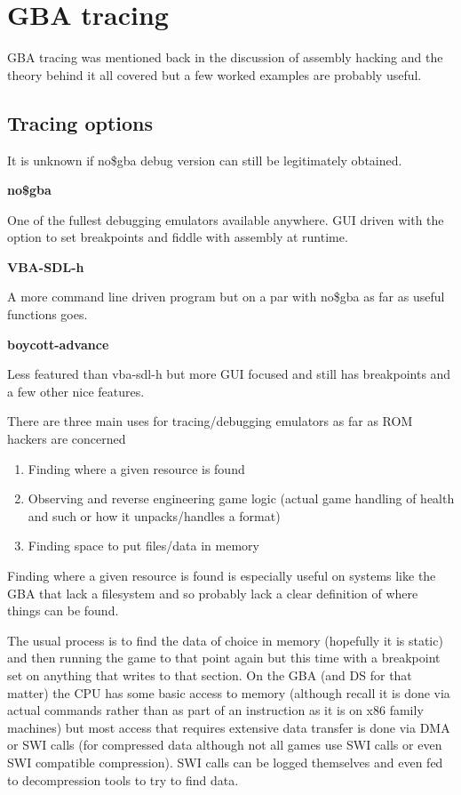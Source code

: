 \documentclass[
]{book}
\providecommand{\tightlist}{%
  \setlength{\itemsep}{0pt}\setlength{\parskip}{0pt}}
\begin{document}
\hypertarget{gba-tracing}{%
\chapter{GBA tracing}\label{gba-tracing}}

GBA tracing was mentioned back in the discussion of assembly hacking and the theory behind it all covered but a few worked examples are probably useful.

\hypertarget{tracing-options}{%
\section{Tracing options}\label{tracing-options}}

It is unknown if no\$gba debug version can still be legitimately obtained.

\textbf{no\$gba}

One of the fullest debugging emulators available anywhere. GUI driven with the option to set breakpoints and fiddle with assembly at runtime.

\textbf{VBA-SDL-h}

A more command line driven program but on a par with no\$gba as far as useful functions goes.

\textbf{boycott-advance}

Less featured than vba-sdl-h but more GUI focused and still has breakpoints and a few other nice features.

There are three main uses for tracing/debugging emulators as far as ROM hackers are concerned

\begin{enumerate}
\def\labelenumi{\arabic{enumi}.}
\tightlist
\item
  Finding where a given resource is found
\item
  Observing and reverse engineering game logic (actual game handling of health and such or how it unpacks/handles a format)
\item
  Finding space to put files/data in memory
\end{enumerate}

Finding where a given resource is found is especially useful on systems like the GBA that lack a filesystem and so probably lack a clear definition of where things can be found.

The usual process is to find the data of choice in memory (hopefully it is static) and then running the game to that point again but this time with a breakpoint set on anything that writes to that section. On the GBA (and DS for that matter) the CPU has some basic access to memory (although recall it is done via actual commands rather than as part of an instruction as it is on x86 family machines) but most access that requires extensive data transfer is done via DMA or SWI calls (for compressed data although not all games use SWI calls or even SWI compatible compression). SWI calls can be logged themselves and even fed to decompression tools to try to find data.
\end{document}
